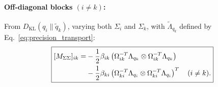 \documentclass[11pt]{article}
\begin{document}
\paragraph{Off-diagonal blocks $(i \neq k)$:} From $D_{\mathrm{KL}}(q_i \| \tilde{q}_k)$, varying both $\Sigma_i$ and $\Sigma_k$, with $\tilde{\Lambda}_{q_k}$ defined by Eq.~\eqref{eq:precision_transport}:
\begin{equation}
\boxed{\begin{aligned}
\relax [M_{\Sigma\Sigma}]_{ik} = &-\frac{1}{2}\beta_{ik}\left(\Omega_{ik}^{-T}\Lambda_{q_k} \otimes \Omega_{ik}^{-T}\Lambda_{q_k}\right) \\
&-\frac{1}{2}\beta_{ki}\left(\Omega_{ki}^{-T}\Lambda_{q_i} \otimes \Omega_{ki}^{-T}\Lambda_{q_i}\right)^T \quad (i \neq k).
\end{aligned}}
\label{eq:mass_sigma_offdiagonal}
\end{equation}
\end{document}
